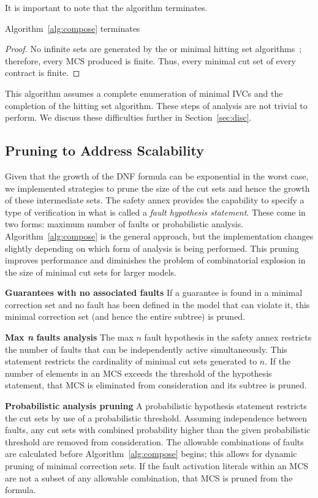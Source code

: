 It is important to note that the algorithm terminates. 
\begin{theorem}
Algorithm~\ref{alg:compose} terminates
\begin{proof}
No infinite sets are generated by the \aivcalg or minimal hitting set algorithms~\cite{Ghassabani2017EfficientGO,murakami2013efficient}; therefore, every MCS produced is finite. Thus, every minimal cut set of every contract is finite.
\end{proof}
\end{theorem}

This algorithm assumes a complete enumeration of minimal IVCs and the completion of the hitting set algorithm. These steps of analysis are not trivial to perform. We discuss these difficulties further in Section~\ref{sec:disc}.

\subsection{Pruning to Address Scalability}
Given that the growth of the DNF formula can be exponential in the worst case, we implemented strategies to prune the size of the cut sets and hence the growth of these intermediate sets. The safety annex provides the capability to specify a type of verification in what is called a \textit{fault hypothesis statement}. These come in two forms: maximum number of faults or probabilistic analysis. Algorithm~\ref{alg:compose} is the general approach, but the implementation changes slightly depending on which form of analysis is being performed. This pruning improves performance and diminishes the problem of combinatorial explosion in the size of minimal cut sets for larger models. 

\textbf{Guarantees with no associated faults} If a guarantee is found in a minimal correction set and no fault has been defined in the model that can violate it, this minimal correction set (and hence the entire subtree) is pruned.

\textbf{Max \textit{n} faults analysis} The max $n$ fault hypothesis in the safety annex restricts the number of faults that can be independently active simultaneously. This statement restricts the cardinality of minimal cut sets generated to $n$. If the number of elements in an MCS exceeds the threshold of the hypothesis statement, that MCS is eliminated from consideration and its subtree is pruned.


\textbf{Probabilistic analysis pruning} A probabilistic hypothesis statement restricts the cut sets by use of a probabilistic threshold. Assuming independence between faults, any cut sets with combined probability higher than the given probabilistic threshold are removed from consideration. The allowable combinations of faults are calculated before Algorithm~\ref{alg:compose} begins; this allows for dynamic pruning of minimal correction sets. If the fault activation literals within an MCS are not a subset of any allowable combination, that MCS is pruned from the formula. 

